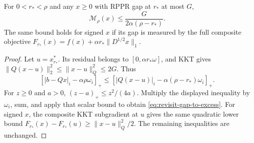 \begin{lemma}
\label{lem:revisit-gap-to-excess}
For $0<r_*<\rho$ and any $x\geq0$ with RPPR gap at $r_*$ at most $G$,
\begin{equation}
 \mathcal M_\rho(x)\leq\frac{G}{2\alpha(\rho-r_*)}.
 \label{eq:revisit-gap-to-excess}
\end{equation}
The same bound holds for signed $x$ if its gap is measured by the full
composite objective $F_{r_*}(x)=f(x)+\alpha r_*\|D^{1/2}x\|_1$.
\end{lemma}
\begin{proof}
Let $u=x^*_{r_*}$. Its residual belongs to
$[0,\alpha r_*\omega]$, and KKT gives
$\|Q(x-u)\|_2^2\leq\|x-u\|_Q^2\leq2G$.
Thus
\[
 [|b-Qx|_i-\alpha\rho\omega_i]_+
 \leq[|Q(x-u)|_i-\alpha(\rho-r_*)\omega_i]_+.
\]
For $z\geq0$ and $a>0$, $(z-a)_+\leq z^2/(4a)$.
Multiply the displayed inequality by $\omega_i$, sum, and apply that
scalar bound to obtain \cref{eq:revisit-gap-to-excess}.
For signed $x$, the composite KKT subgradient at $u$ gives the same
quadratic lower bound $F_{r_*}(x)-F_{r_*}(u)\geq\|x-u\|_Q^2/2$.
The remaining inequalities are unchanged.
\end{proof}

